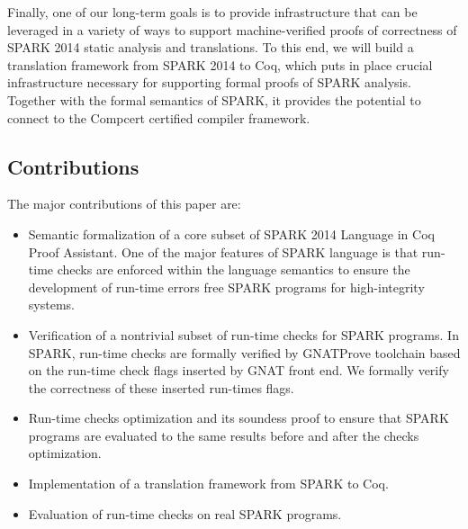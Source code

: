 Finally, one of our long-term goals is to provide infrastructure that can be 
leveraged in a variety of ways to support machine-verified proofs of 
correctness of SPARK 2014 static analysis and 
translations. To this end, we will build a translation framework 
from SPARK 2014 to Coq, which puts in place crucial infrastructure 
necessary for supporting formal proofs of SPARK analysis. Together 
with the formal semantics of SPARK, it provides the potential to 
connect to the Compcert \cite{Leroy:09} certified compiler framework.

\subsection{Contributions}
The major contributions of this paper are:
\begin{itemize}
\item Semantic formalization of a core subset of SPARK 2014 Language in Coq
Proof Assistant. One of the major features of SPARK language is that run-time
checks are enforced within the language semantics to ensure the development of
run-time errors free SPARK programs for high-integrity systems.
\item Verification of a nontrivial subset of run-time checks for SPARK programs. 
In SPARK, run-time checks are formally verified by GNATProve toolchain based on
the run-time check flags inserted by GNAT front end. We formally verify the
correctness of these inserted run-times flags.
\item Run-time checks optimization and its soundess proof to ensure that SPARK
programs are evaluated to the same results before and after the checks
optimization.
\item Implementation of a translation framework from SPARK to Coq.
\item Evaluation of run-time checks on real SPARK programs.
\end{itemize}  